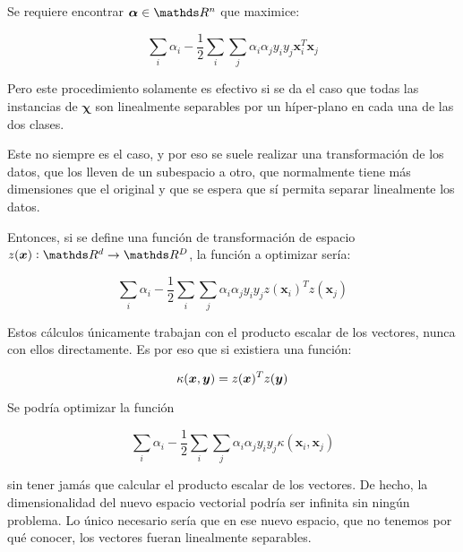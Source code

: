 \documentclass{article}
\begin{document}
Se requiere encontrar $\bm{\alpha} \in \reals^n$ que maximice:

\begin{equation}
 \sum_i\alpha_i - \frac{1}{2}\sum_i\sum_j\alpha_i\alpha_jy_iy_j\bm{x}_i^T\bm{x}_j
\end{equation}

%

Pero este procedimiento solamente es efectivo si se da el caso que todas las
instancias de $\bm{\chi}$ son linealmente separables por un híper-plano en cada
una de las dos clases.

Este no siempre es el caso, y por eso se suele realizar una transformación de los
datos, que los lleven de un subespacio a otro, que normalmente tiene más dimensiones
que el original y que se espera que sí permita separar linealmente los datos.

Entonces, si se define una función de transformación de espacio
$z(\bm{x}) : \reals^d \rightarrow \reals^D$, la función a optimizar sería:

\begin{equation}
 \sum_i\alpha_i - \frac{1}{2}\sum_i\sum_j\alpha_i\alpha_jy_iy_jz(\bm{x}_i)^Tz(\bm{x}_j)
\end{equation}

Estos cálculos únicamente trabajan con el producto escalar de los vectores, nunca
con ellos directamente. Es por eso que si existiera una función:

\begin{equation}
 \kappa(\bm{x}, \bm{y}) = z(\bm{x})^Tz(\bm{y})
\end{equation}

Se podría optimizar la función

\begin{equation}
 \sum_i\alpha_i - \frac{1}{2}\sum_i\sum_j\alpha_i\alpha_jy_iy_j\kappa(\bm{x}_i, \bm{x}_j)
\end{equation}

sin tener jamás que calcular el producto escalar de los vectores. De hecho, la
dimensionalidad del nuevo espacio vectorial podría ser infinita sin ningún problema.
Lo único necesario sería que en ese nuevo espacio, que no tenemos por qué conocer,
los vectores fueran linealmente separables.
\end{document}
